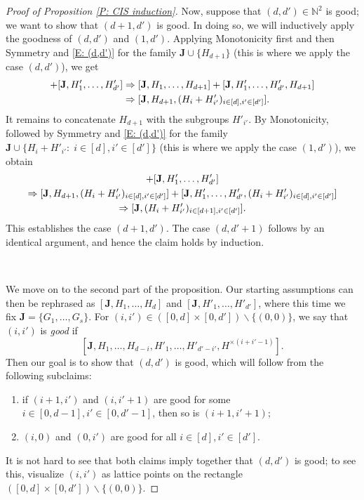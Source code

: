 \documentclass[11pt]{amsart}
\theoremstyle{definition}
\newcommand{\N}{{\mathbb N}}
\newcommand{\bJ}{{\mathbf{J}}}
\newcommand{\1}{{\mathbf{1}}}
\begin{document}
\begin{proof}[Proof of Proposition \ref{P: CIS induction}]
       Now, suppose that $(d,d')\in\N^2$ is good; we want to show that $(d+1,d')$ is good. In doing so, we will inductively apply the goodness of $(d,d')$ and $(1,d')$. Applying Monotonicity first and then Symmetry and \eqref{E: (d,d')} for the family $\bJ\cup\{H_{d+1}\}$ (this is where we apply the case $(d,d')$), we get
       \begin{align*}
           [\bold{J},H_{1},\dots,H_{d+1}]+[\bold{J},H'_{1},\dots,H'_{d'}] &\Rightarrow [\bold{J},H_{1},\dots,H_{d+1}]+[\bold{J},H'_{1},\dots,H'_{d'}, H_{d+1}]\\
           &\Rightarrow [\bold{J}, H_{d+1}, (H_{i}+H'_{i'})_{i\in[d], i'\in[d']}].
       \end{align*}
        It remains to concatenate $H_{d+1}$ with the subgroups $H'_{i'}$. By Monotonicity, followed by Symmetry and  \eqref{E: (d,d')} for the family $\bJ\cup\{H_{i}+H'_{i'}:\; i\in[d], i'\in[d']\}$ (this is where we apply the case $(1,d')$), we obtain
        \begin{multline*}
            [\bold{J}, H_{d+1}, (H_{i}+H'_{i'})_{i\in[d], i'\in[d']}] + [\bold{J},H'_{1},\dots,H'_{d'}]\\ \Rightarrow [\bold{J}, H_{d+1}, (H_{i}+H'_{i'})_{i\in[d], i'\in[d']}] + [\bold{J},H'_{1},\dots,H'_{d'}, (H_{i}+H'_{i'})_{i\in[d], i'\in[d']}]\\
            \Rightarrow [\bold{J}, (H_{i}+H'_{i'})_{i\in[d+1], i'\in[d']}].
        \end{multline*}
        This establishes the case $(d+1,d')$. The case $(d,d'+1)$ follows by an identical argument, and hence the claim holds by induction.

        \

	We move on to the second part of the proposition. %
	Our starting assumptions can then be rephrased %
    as $[\bJ, H_{1},\dots,H_{d}]$ and $[\bJ, H'_{1},\dots,H'_{d'}]$, where this time we fix $\bJ = \{G_1, \ldots, G_s\}$.
	For $(i,i')\in([0,d]\times[0,d'])\backslash\{(0,0)\}$, we say that $(i,i')$ is \emph{good} if 
    $$[\bJ, H_{1},\dots,H_{d-i},H'_{1},\dots,H'_{d'-i'},H^{\times (i+i'-1)}].$$ 
    Then our goal is to show that $(d,d')$  is good, which will follow from the following subclaims:
    \begin{enumerate}
        \item if $(i+1,i')$ and $(i,i'+1)$ are good for some  $i\in[0,d-1], i'\in[0,d'-1]$, then so is $(i+1,i'+1)$;
        \item $(i,0)$ and $(0,i')$ are good for all $i\in[d], i'\in[d']$.
    \end{enumerate}
      It is not hard to see that both claims imply together that $(d,d')$ is good; to see this, visualize $(i,i')$ as lattice points on the rectangle $([0,d]\times[0,d'])\backslash\{(0,0)\}$.
	

\end{proof}
\end{document}

